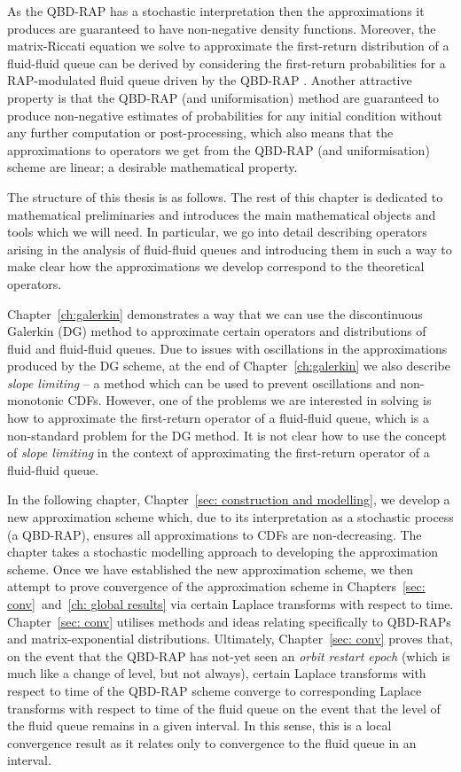 As the QBD-RAP has a stochastic interpretation then the approximations it produces are guaranteed to have non-negative density functions. Moreover, the matrix-Riccati equation we solve to approximate the first-return distribution of a fluid-fluid queue can be derived by considering the first-return probabilities for a RAP-modulated fluid queue driven by the QBD-RAP \citep{p2019,bgnp2021}. Another attractive property is that the QBD-RAP (and uniformisation) method are guaranteed to produce non-negative estimates of probabilities for any initial condition without any further computation or post-processing, which also means that the approximations to operators we get from the QBD-RAP (and uniformisation) scheme are linear; a desirable mathematical property.

The structure of this thesis is as follows. The rest of this chapter is dedicated to mathematical preliminaries and introduces the main mathematical objects and tools which we will need. In particular, we go into detail describing operators arising in the analysis of fluid-fluid queues and introducing them in such a way to make clear how the approximations we develop correspond to the theoretical operators. 

Chapter~\ref{ch:galerkin} demonstrates a way that we can use the discontinuous Galerkin (DG) method to approximate certain operators and distributions of fluid and fluid-fluid queues. Due to issues with oscillations in the approximations produced by the DG scheme, at the end of Chapter~\ref{ch:galerkin} we also describe \emph{slope limiting} -- a method which can be used to prevent oscillations and non-monotonic CDFs. However, one of the problems we are interested in solving is how to approximate the first-return operator of a fluid-fluid queue, which is a non-standard problem for the DG method. It is not clear how to use the concept of \emph{slope limiting} in the context of approximating the first-return operator of a fluid-fluid queue. 

In the following chapter, Chapter~\ref{sec: construction and modelling}, we develop a new approximation scheme which, due to its interpretation as a stochastic process (a QBD-RAP), ensures all approximations to CDFs are non-decreasing. The chapter takes a stochastic modelling approach to developing the approximation scheme. Once we have established the new approximation scheme, we then attempt to prove convergence of the approximation scheme in Chapters~\ref{sec: conv}~and~\ref{ch: global results} via certain Laplace transforms with respect to time. Chapter~\ref{sec: conv} utilises methods and ideas relating specifically to QBD-RAPs and matrix-exponential distributions. Ultimately, Chapter~\ref{sec: conv} proves that, on the event that the QBD-RAP has not-yet seen an \emph{orbit restart epoch} (which is much like a change of level, but not always), certain Laplace transforms with respect to time of the QBD-RAP scheme converge to corresponding Laplace transforms with respect to time of the fluid queue on the event that the level of the fluid queue remains in a given interval. In this sense, this is a local convergence result as it relates only to convergence to the fluid queue in an interval. 

